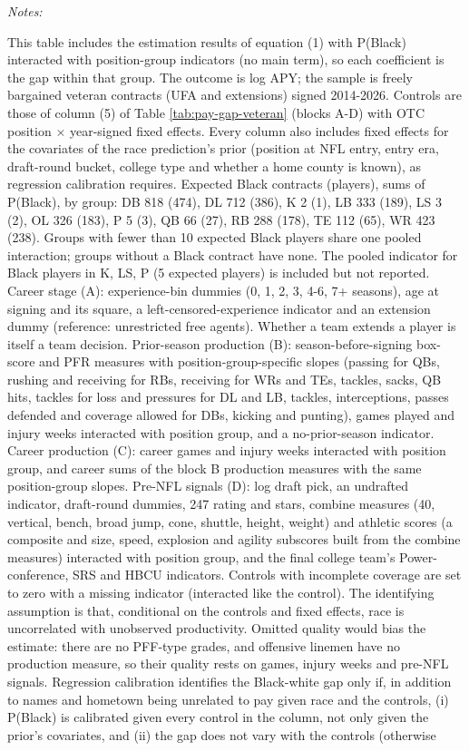 \begin{table}[!h]
{\begin{threeparttable}
\begin{tablenotes}[para]
\item \textit{Notes:} 
\item This table includes the estimation results of equation (1) with P(Black) interacted with position-group indicators (no main term), so each coefficient is the gap within that group. The outcome is log APY; the sample is freely bargained veteran contracts (UFA and extensions) signed 2014-2026. Controls are those of column (5) of Table \ref{tab:pay-gap-veteran} (blocks A-D) with OTC position $\times$ year-signed fixed effects. Every column also includes fixed effects for the covariates of the race prediction's prior (position at NFL entry, entry era, draft-round bucket, college type and whether a home county is known), as regression calibration requires. Expected Black contracts (players), sums of P(Black), by group: DB 818 (474), DL 712 (386), K 2 (1), LB 333 (189), LS 3 (2), OL 326 (183), P 5 (3), QB 66 (27), RB 288 (178), TE 112 (65), WR 423 (238). Groups with fewer than 10 expected Black players share one pooled interaction; groups without a Black contract have none. The pooled indicator for Black players in K, LS, P (5 expected players) is included but not reported. Career stage (A): experience-bin dummies (0, 1, 2, 3, 4-6, 7+ seasons), age at signing and its square, a left-censored-experience indicator and an extension dummy (reference: unrestricted free agents). Whether a team extends a player is itself a team decision. Prior-season production (B): season-before-signing box-score and PFR measures with position-group-specific slopes (passing for QBs, rushing and receiving for RBs, receiving for WRs and TEs, tackles, sacks, QB hits, tackles for loss and pressures for DL and LB, tackles, interceptions, passes defended and coverage allowed for DBs, kicking and punting), games played and injury weeks interacted with position group, and a no-prior-season indicator. Career production (C): career games and injury weeks interacted with position group, and career sums of the block B production measures with the same position-group slopes. Pre-NFL signals (D): log draft pick, an undrafted indicator, draft-round dummies, 247 rating and stars, combine measures (40, vertical, bench, broad jump, cone, shuttle, height, weight) and athletic scores (a composite and size, speed, explosion and agility subscores built from the combine measures) interacted with position group, and the final college team's Power-conference, SRS and HBCU indicators. Controls with incomplete coverage are set to zero with a missing indicator (interacted like the control). The identifying assumption is that, conditional on the controls and fixed effects, race is uncorrelated with unobserved productivity. Omitted quality would bias the estimate: there are no PFF-type grades, and offensive linemen have no production measure, so their quality rests on games, injury weeks and pre-NFL signals. Regression calibration identifies the Black-white gap only if, in addition to names and hometown being unrelated to pay given race and the controls, (i) P(Black) is calibrated given every control in the column, not only given the prior's covariates, and (ii) the gap does not vary with the controls (otherwise 
\end{tablenotes}
\end{threeparttable}}
\end{table}
